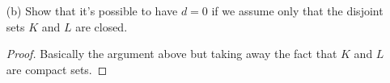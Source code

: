 \begin{enumerate}
\begin{proof}
\begin{align*}
                                                           &\leq | x_{n_k} - x_0 | + | y_{n_k} - y_0  | \\   
                                                           &< \frac{ \epsilon  }{ 2 }  + \frac{ \epsilon  }{ 2 }  \\
                                                           &= \epsilon.
            \end{align*}
            Since \( d = | x_0 - y_0 | = 0   \), we have that \( \lim | x_{n_k} - y_{n_k} | = d = 0   \). But this means that \( K \cap L \neq \emptyset \) since \( K \) and \( L \) are closed sets which is a contradiction. Hence, we must have \( d > 0  \).
        \end{proof}
    \item[(b)] Show that it's possible to have \( d = 0  \) if we assume only that the disjoint sets \( K \) and \( L \) are closed.
        \begin{proof}
            Basically the argument above but taking away the fact that \( K \) and \(  L \) are compact sets.
        \end{proof}
\end{enumerate}

